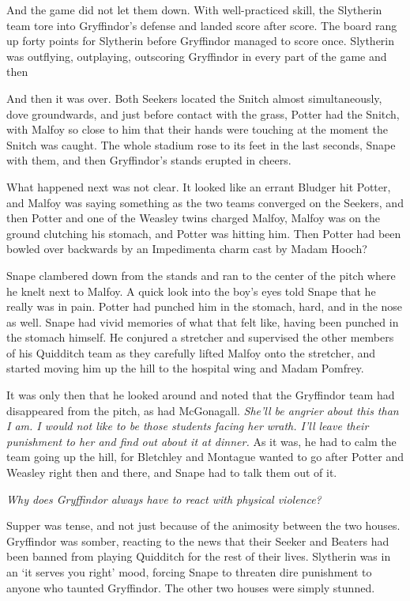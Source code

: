 And the game did not let them down. With well-practiced skill, the Slytherin team tore into Gryffindor's defense and landed score after score. The board rang up forty points for Slytherin before Gryffindor managed to score once. Slytherin was outflying, outplaying, outscoring Gryffindor in every part of the game and then{\el}

And then it was over. Both Seekers located the Snitch almost simultaneously, dove groundwards, and just before contact with the grass, Potter had the Snitch, with Malfoy so close to him that their hands were touching at the moment the Snitch was caught. The whole stadium rose to its feet in the last seconds, Snape with them, and then Gryffindor's stands erupted in cheers.

What happened next was not clear. It looked like an errant Bludger hit Potter, and Malfoy was saying something as the two teams converged on the Seekers, and then Potter and one of the Weasley twins charged Malfoy, Malfoy was on the ground clutching his stomach, and Potter was hitting him. Then Potter had been bowled over backwards by an Impedimenta charm cast by{\el} Madam Hooch?

Snape clambered down from the stands and ran to the center of the pitch where he knelt next to Malfoy. A quick look into the boy's eyes told Snape that he really was in pain. Potter had punched him in the stomach, hard, and in the nose as well. Snape had vivid memories of what that felt like, having been punched in the stomach himself. He conjured a stretcher and supervised the other members of his Quidditch team as they carefully lifted Malfoy onto the stretcher, and started moving him up the hill to the hospital wing and Madam Pomfrey.

It was only then that he looked around and noted that the Gryffindor team had disappeared from the pitch, as had McGonagall. \emph{She'll be angrier about this than I am. I would not like to be those students facing her wrath. I'll leave their punishment to her and find out about it at dinner.} As it was, he had to calm the team going up the hill, for Bletchley and Montague wanted to go after Potter and Weasley right then and there, and Snape had to talk them out of it.

\emph{Why does Gryffindor always have to react with physical violence?}

Supper was tense, and not just because of the animosity between the two houses. Gryffindor was somber, reacting to the news that their Seeker and Beaters had been banned from playing Quidditch for the rest of their lives. Slytherin was in an `it serves you right' mood, forcing Snape to threaten dire punishment to anyone who taunted Gryffindor. The other two houses were simply stunned.

